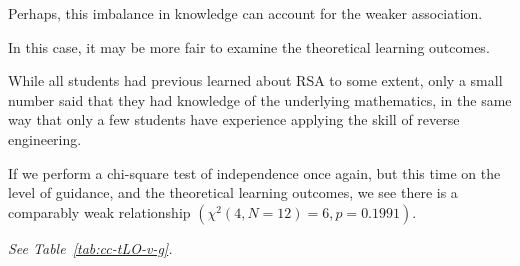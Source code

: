 Perhaps, this imbalance in knowledge can account for the weaker association. %







In this case, it may be more fair to examine the theoretical learning outcomes. %







While all students had previous learned about RSA to some extent, only a small number said that they had knowledge of the underlying mathematics, in the same way that only a few students have experience applying the skill of reverse engineering. %







If we perform a chi-square test of independence once again, but this time on the level of guidance, and the theoretical learning outcomes, we see there is a comparably weak relationship $(\chi^2(4, N=12)=6,  p = 0.1991)$. %







\emph{See Table~\ref{tab:cc-tLO-v-g}.}















